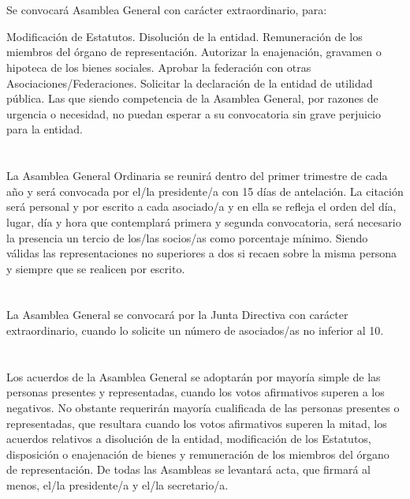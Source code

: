 \documentclass[draft]{estatutos}
\begin{document}
\begin{linenumbers}[1]
  \section{}
  Se convocará Asamblea General con carácter extraordinario, para:

  \begin{enumerate}
  \sub Modificación de Estatutos.
  \sub Disolución de la entidad.
  \sub Remuneración de los miembros del órgano de representación.
  \sub Autorizar la enajenación, gravamen o hipoteca de los bienes sociales.
  \sub Aprobar la federación con otras Asociaciones/Federaciones.
  \sub Solicitar la declaración de la entidad de utilidad pública.
  \sub Las que siendo competencia de la Asamblea General, por razones de
      urgencia o necesidad, no puedan esperar a su convocatoria sin grave
      perjuicio para la entidad.
  \end{enumerate}
    
  \section{}
  La Asamblea General Ordinaria se reunirá dentro del primer trimestre de cada
  año y será convocada por el/la presidente/a con 15 días de antelación. La
  citación será personal y por escrito a cada asociado/a y en ella se refleja
  el orden del día, lugar, día y hora que contemplará primera y segunda
  convocatoria, será necesario la presencia un tercio de los/las socios/as como
  porcentaje mínimo. Siendo válidas las representaciones no superiores a dos si
  recaen sobre la misma persona y siempre que se realicen por escrito.

  \section{}
  La Asamblea General se convocará por la Junta Directiva con carácter
  extraordinario, cuando lo solicite un número de asociados/as no inferior al
  10.

  \section{}
  Los acuerdos de la Asamblea General se adoptarán por mayoría simple de las
  personas presentes y representadas, cuando los votos afirmativos superen a
  los negativos. No obstante requerirán mayoría cualificada de las personas
  presentes o representadas, que resultara cuando los votos afirmativos
  superen la mitad, los acuerdos relativos a disolución de la entidad,
  modificación de los Estatutos, disposición o enajenación de bienes y
  remuneración de los miembros del órgano de representación. De todas las
  Asambleas se levantará acta, que firmará al menos, el/la presidente/a y
  el/la secretario/a.


\end{linenumbers}
\end{document}
